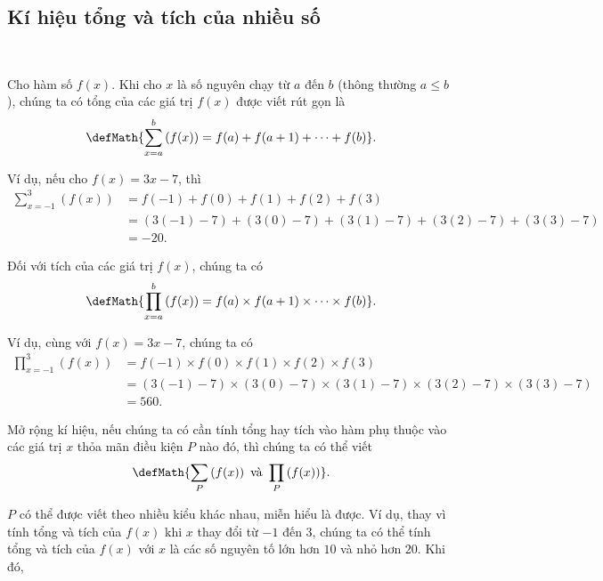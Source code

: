 \subsection{Kí hiệu tổng và tích của nhiều số}

\ %

Cho hàm số $f(x)$. Khi cho $x$ là số nguyên chạy từ $a$ đến $b$ (thông thường $a \le b$), chúng ta có tổng của các giá trị $f(x)$ được viết rút gọn là
$$
\defMath{\sum_{x=a}^{b} \left(f(x)\right) = f(a) + f(a + 1) + \cdots + f(b)}.
$$

Ví dụ, nếu cho $f(x) = 3x - 7$, thì
\begin{align*}
   \sum_{x = -1}^3 \left(f(x)\right) &= f(-1) + f(0) + f(1) + f(2) + f(3) \\
   &= \left(3(-1) - 7\right) + \left(3(0) - 7\right) + \left(3(1) - 7\right) + \left(3(2) - 7\right) + \left(3(3) - 7\right) \\
   &= -20.
\end{align*}

Đối với tích của các giá trị $f(x)$, chúng ta có
$$
\defMath{\prod_{x=a}^{b} \left(f(x)\right) = f(a) \times f(a + 1) \times \cdots \times f(b)}.
$$

Ví dụ, cùng với $f(x) = 3x - 7$, chúng ta có
\begin{align*}
   \prod_{x = -1}^3 \left(f(x)\right) &= f(-1) \times f(0) \times f(1) \times f(2) \times f(3) \\
   &= \left(3(-1) - 7\right) \times \left(3(0) - 7\right) \times \left(3(1) - 7\right) \times \left(3(2) - 7\right) \times \left(3(3) - 7\right) \\
   &= 560.
\end{align*}

Mở rộng kí hiệu, nếu chúng ta có cần tính tổng hay tích vào hàm phụ thuộc vào các giá trị $x$ thỏa mãn điều kiện $P$ nào đó, thì chúng ta có thể viết
$$
\defMath{\sum_{P} \left(f(x)\right) \text{ và }\prod_{P} \left(f(x)\right)}.
$$

$P$ có thể được viết theo nhiều kiểu khác nhau, miễn hiểu là được. Ví dụ, thay vì tính tổng và tích của $f(x)$ khi $x$ thay đổi từ $-1$ đến $3$, chúng ta có thể tính tổng và tích của $f(x)$ với $x$ là các số nguyên tố lớn hơn $10$ và nhỏ hơn $20$. Khi đó,

